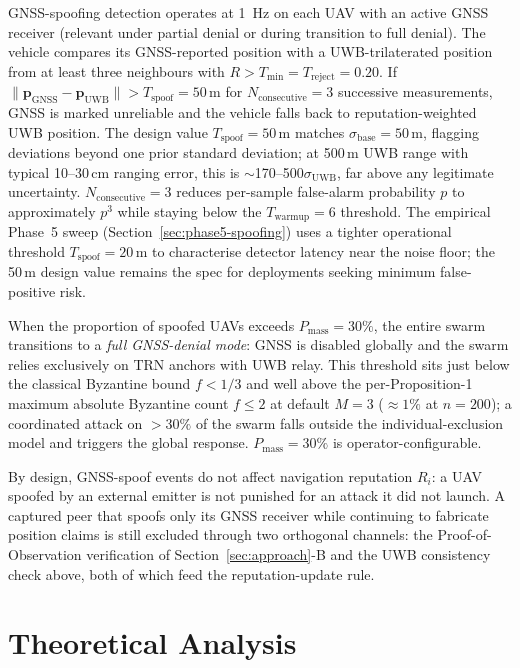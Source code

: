 \documentclass[journal,10pt,twocolumn]{IEEEtran}
\begin{document}
GNSS-spoofing detection operates at 1~Hz on each UAV with an active GNSS receiver (relevant under partial denial or during transition to full denial). The vehicle compares its GNSS-reported position with a UWB-trilaterated position from at least three neighbours with $R > T_\text{min} = T_\text{reject} = 0.20$. If $\lVert \mathbf{p}_\text{GNSS} - \mathbf{p}_\text{UWB} \rVert > T_\text{spoof} = 50$\,m for $N_\text{consecutive} = 3$ successive measurements, GNSS is marked unreliable and the vehicle falls back to reputation-weighted UWB position. The design value $T_\text{spoof}=50$\,m matches $\sigma_\text{base}=50$\,m, flagging deviations beyond one prior standard deviation; at 500\,m UWB range with typical 10--30\,cm ranging error, this is $\sim$170--500$\sigma_\text{UWB}$, far above any legitimate uncertainty. $N_\text{consecutive}=3$ reduces per-sample false-alarm probability $p$ to approximately $p^3$ while staying below the $T_\text{warmup}=6$ threshold. The empirical Phase~5 sweep (Section~\ref{sec:phase5-spoofing}) uses a tighter operational threshold $T_\text{spoof}=20$\,m to characterise detector latency near the noise floor; the 50\,m design value remains the spec for deployments seeking minimum false-positive risk.

When the proportion of spoofed UAVs exceeds $P_\text{mass} = 30\%$, the entire swarm transitions to a \emph{full GNSS-denial mode}: GNSS is disabled globally and the swarm relies exclusively on TRN anchors with UWB relay. This threshold sits just below the classical Byzantine bound $f<1/3$ and well above the per-Proposition-1 maximum absolute Byzantine count $f \leq 2$ at default $M=3$ ($\approx 1\%$ at $n=200$); a coordinated attack on $>30\%$ of the swarm falls outside the individual-exclusion model and triggers the global response. $P_\text{mass}=30\%$ is operator-configurable.

By design, GNSS-spoof events do not affect navigation reputation $R_i$: a UAV spoofed by an external emitter is not punished for an attack it did not launch. A captured peer that spoofs only its GNSS receiver while continuing to fabricate position claims is still excluded through two orthogonal channels: the Proof-of-Observation verification of Section~\ref{sec:approach}-B and the UWB consistency check above, both of which feed the reputation-update rule.

\section{Theoretical Analysis}
\label{sec:theory}
\end{document}
